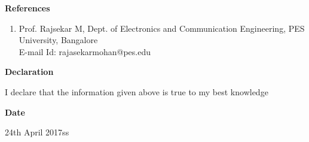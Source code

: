 \documentclass[a4paper,12pt,final]{memoir}
\newcommand{\Sep}{\vspace{1.5em}}
\newcommand{\SmallSep}{\vspace{0.5em}}
\newcommand{\CVSection}[1]
{\Large\textbf{#1}\par
	\SmallSep\normalsize\normalfont}
\begin{document}
	\CVSection{References}
		\begin{enumerate}
			\item Prof. Rajsekar M, Dept. of Electronics and Communication Engineering, PES University, Bangalore\\
			E-mail Id: rajasekarmohan@pes.edu 
		\end{enumerate}
	\Sep
	\clearpage
	\framebreak
	\framebreak
		
	\CVSection{Declaration}
		I declare that the information given above is true to my best knowledge
	\Sep
	
	\CVSection{Date}
		24th April 2017ss
	\Sep

	
\end{document}
